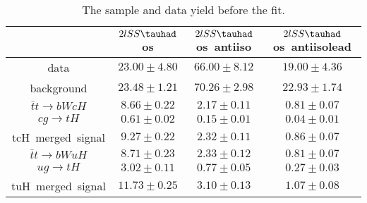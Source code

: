 \begin{table}
\footnotesize
\caption{The sample and data yield before the fit.}
\centering
\begin{tabular}{|c|c|c|c|} \hline
 & $2lSS\tauhad$ os & $2lSS\tauhad$ os~antiiso & $2lSS\tauhad$ os~antiisolead\\\hline
data & $23.00\pm4.80$ & $66.00\pm8.12$ & $19.00\pm4.36$\\\hline
background & $23.48\pm1.21$ & $70.26\pm2.98$ & $22.93\pm1.74$\\\hline
$\bar{t}t\to bWcH$ & $8.66\pm0.22$ & $2.17\pm0.11$ & $0.81\pm0.07$\\\hline
$cg\to tH$ & $0.61\pm0.02$ & $0.15\pm0.01$ & $0.04\pm0.01$\\\hline
tcH~merged~signal & $9.27\pm0.22$ & $2.32\pm0.11$ & $0.86\pm0.07$\\\hline
$\bar{t}t\to bWuH$ & $8.71\pm0.23$ & $2.33\pm0.12$ & $0.81\pm0.07$\\\hline
$ug\to tH$ & $3.02\pm0.11$ & $0.77\pm0.05$ & $0.27\pm0.03$\\\hline
tuH~merged~signal & $11.73\pm0.25$ & $3.10\pm0.13$ & $1.07\pm0.08$\\\hline
\end{tabular}
\label{tab:yield}
\end{table}
